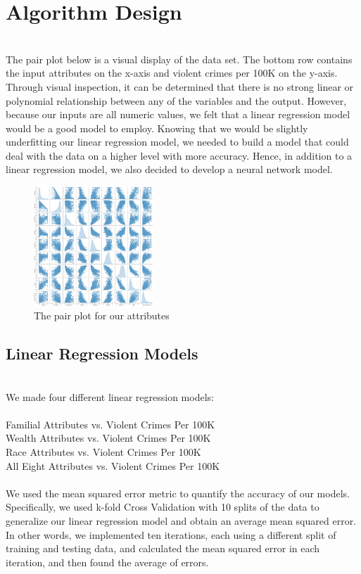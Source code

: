 \documentclass[letterpaper, 11 pt, conference]{article}
\begin{document}
\section{Algorithm Design}
\\The pair plot below is a visual display of the data set. The bottom row contains the input attributes on the x-axis and violent crimes per 100K on the y-axis. Through visual inspection, it can be determined that there is no strong linear or polynomial relationship between any of the variables and the output. However, because our inputs are all numeric values, we felt that a linear regression model would be a good model to employ. Knowing that we would be slightly underfitting our linear regression model, we needed to build a model that could deal with the data on a higher level with more accuracy. Hence, in addition to a linear regression model, we also decided to develop a neural network model.
\begin{figure}[H]
\centering
\includegraphics[width=0.4\textwidth]{Pairplot.png}
\caption{\label{fig:pairplot}The pair plot for our attributes}
\end{figure}

\subsection{Linear Regression Models}
\\We made four different linear regression models:
\\
\\ Familial Attributes vs. Violent Crimes Per 100K
\\ Wealth Attributes vs. Violent Crimes Per 100K
\\ Race Attributes vs. Violent Crimes Per 100K
\\ All Eight Attributes vs. Violent Crimes Per 100K
\\
\\We used the mean squared error metric to quantify the accuracy of our models. Specifically, we used k-fold Cross Validation with 10 splits of the data to generalize our linear regression model and obtain an average mean squared error. In other words, we implemented ten iterations, each using a different split of training and testing data, and calculated the mean squared error in each iteration, and then found the average of errors.
\end{document}
